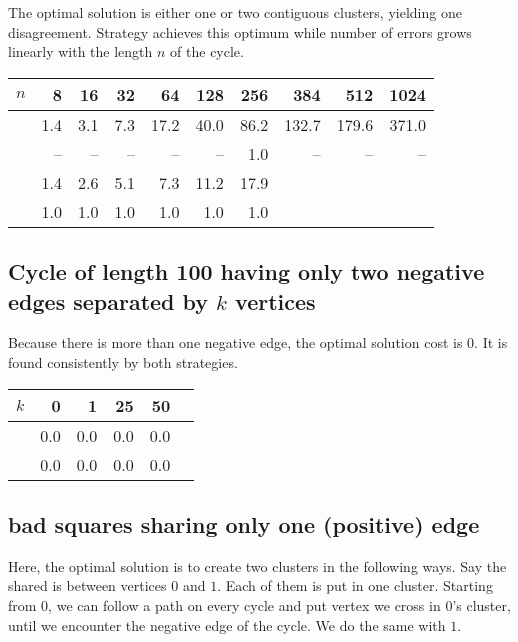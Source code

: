 The optimal solution is either one or two contiguous clusters, yielding one
disagreement. Strategy \pat{} achieves this optimum while \pot{} number of
errors grows linearly with the length $n$ of the cycle.

\begin{center}
\begin{tabular}{lrrrrrrrrr}
\toprule
$n$      & 8   & 16  & 32  & 64   & 128  & 256  & 384   & 512   & 1024 \\
\midrule
\pot{}   & 1.4 & 3.1 & 7.3 & 17.2 & 40.0 & 86.2 & 132.7 & 179.6 & 371.0 \\
\pat{}   & --  & --  & --  & --   & --   & 1.0  & --    & --    & -- \\
\nnot{}  & 1.4 & 2.6 & 5.1 & 7.3  & 11.2 & 17.9 &       &       & \\
\nat{}   & 1.0 & 1.0 & 1.0 & 1.0  & 1.0  & 1.0  &       &       & \\
\bottomrule
\end{tabular}
\end{center}



\subsection{Cycle of length 100 having only two negative edges separated by
	$k$ vertices}
Because there is more than one negative edge, the optimal solution cost is 0.
It is found consistently by both strategies.

\begin{center}
\begin{tabular}{lrrrrr}
\toprule
$k$ &   0  &   1  &   25 &   50  \\
\midrule
\pot{} & 0.0 & 0.0 & 0.0 & 0.0  \\
\pat{} &  0.0 &  0.0 & 0.0 & 0.0  \\
\bottomrule
\end{tabular}
\end{center}

\subsection{bad squares sharing only one (positive) edge}
\label{sub:squares}
Here, the optimal solution is to create two clusters in the following ways.
Say the shared is between vertices $0$ and $1$. Each of them is put in one
cluster. Starting from $0$, we can follow a path on every cycle and put
vertex we cross in $0$'s cluster, until we encounter the negative edge of the
cycle. We do the same with $1$.

